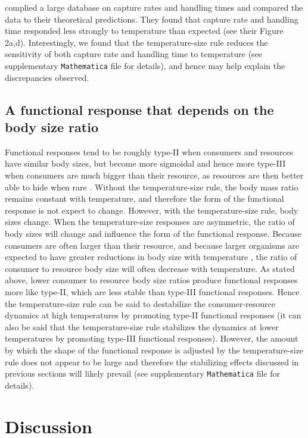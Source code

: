 \documentclass[11pt]{article}
\begin{document}
\cite{Rall2012} complied a large database on capture rates and handling times and compared the data to their theoretical predictions.
They found that capture rate and handling time responded less strongly to temperature than expected (see their Figure 2a,d).
Interestingly, we found that the temperature-size rule reduces the sensitivity of both capture rate and handling time to temperature (see supplementary \texttt{Mathematica} file for details), and hence may help explain the discrepancies observed. 

\subsection*{A functional response that depends on the body size ratio}

Functional responses tend to be roughly type-II when consumers and resources have similar body sizes, but become more sigmoidal and hence more type-III when consumers are much bigger than their resource, as resources are then better able to hide when rare \citep{Kalinkat2013}.
Without the temperature-size rule, the body mass ratio remains constant with temperature, and therefore the form of the functional response is not expect to change.
However, with the temperature-size rule, body sizes change.
When the temperature-size responses are asymmetric, the ratio of body sizes will change and influence the form of the functional response.
Because consumers are often larger than their resource, and because larger organisms are expected to have greater reductions in body size with temperature \citep{Forster2012}, the ratio of consumer to resource body size will often decrease with temperature.
As stated above, lower consumer to resource body size ratios produce functional responses more like type-II, which are less stable than type-III functional responses.
Hence the temperature-size rule can be said to destabilize the consumer-resource dynamics at high temperatures by promoting type-II functional responses (it can also be said that the temperature-size rule stabilizes the dynamics at lower temperatures by promoting type-III functional responses).
However, the amount by which the shape of the functional response is adjusted by the temperature-size rule does not appear to be large and therefore the stabilizing effects discussed in previous sections will likely prevail (see supplementary \texttt{Mathematica} file for details). 

\section*{Discussion}
\end{document}
